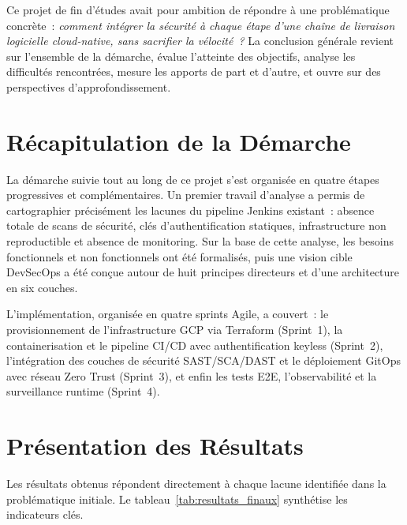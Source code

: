 ﻿Ce projet de fin d'études avait pour ambition de répondre à une problématique concrète~:
\textit{comment intégrer la sécurité à chaque étape d'une chaîne de livraison logicielle
cloud-native, sans sacrifier la vélocité~?} La conclusion générale revient sur l'ensemble
de la démarche, évalue l'atteinte des objectifs, analyse les difficultés rencontrées,
mesure les apports de part et d'autre, et ouvre sur des perspectives d'approfondissement.

\section*{Récapitulation de la Démarche}

La démarche suivie tout au long de ce projet s'est organisée en quatre étapes progressives
et complémentaires. Un premier travail d'analyse a permis de cartographier précisément
les lacunes du pipeline Jenkins existant~: absence totale de scans de sécurité, clés
d'authentification statiques, infrastructure non reproductible et absence de monitoring.
Sur la base de cette analyse, les besoins fonctionnels et non fonctionnels ont été formalisés,
puis une vision cible DevSecOps a été conçue autour de huit principes directeurs et d'une
architecture en six couches.

L'implémentation, organisée en quatre sprints Agile, a couvert~: le provisionnement de
l'infrastructure GCP via Terraform (Sprint~1), la containerisation et le pipeline CI/CD
avec authentification keyless (Sprint~2), l'intégration des couches de sécurité SAST/SCA/DAST
et le déploiement GitOps avec réseau Zero Trust (Sprint~3), et enfin les tests E2E,
l'observabilité et la surveillance runtime (Sprint~4).

\section*{Présentation des Résultats}

Les résultats obtenus répondent directement à chaque lacune identifiée dans la problématique
initiale. Le tableau~\ref{tab:resultats_finaux} synthétise les indicateurs clés.

